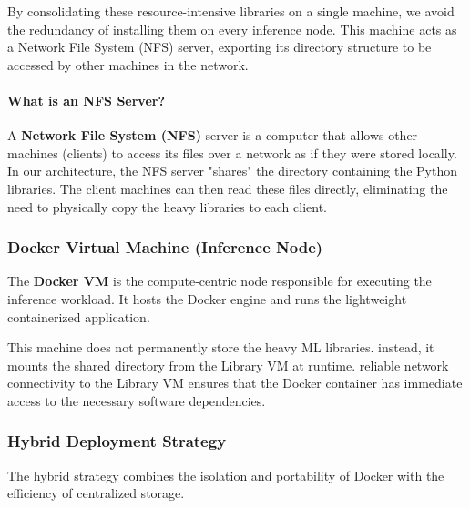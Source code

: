 \documentclass{ieeeaccess}
\begin{document}
By consolidating these resource-intensive libraries on a single machine, we avoid the redundancy of installing them on every inference node. This machine acts as a Network File System (NFS) server, exporting its directory structure to be accessed by other machines in the network.

\paragraph{What is an NFS Server?}

A \textbf{Network File System (NFS)} server is a computer that allows other machines (clients) to access its files over a network as if they were stored locally. In our architecture, the NFS server "shares" the directory containing the Python libraries. The client machines can then read these files directly, eliminating the need to physically copy the heavy libraries to each client.

\subsubsection{Docker Virtual Machine (Inference Node)}

The \textbf{Docker VM} is the compute-centric node responsible for executing the inference workload. It hosts the Docker engine and runs the lightweight containerized application.

This machine does not permanently store the heavy ML libraries. instead, it mounts the shared directory from the Library VM at runtime. reliable network connectivity to the Library VM ensures that the Docker container has immediate access to the necessary software dependencies.

\subsubsection{Hybrid Deployment Strategy}

The hybrid strategy combines the isolation and portability of Docker with the efficiency of centralized storage.
\end{document}
